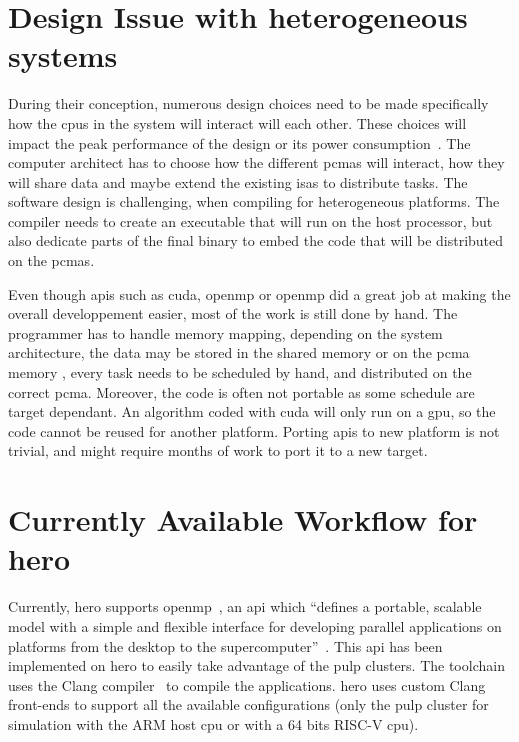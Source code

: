 \section {Design Issue with heterogeneous systems}

    During their conception, numerous design choices need to be made specifically how the \glspl{cpu} in the system will interact will each other. 
		These choices will impact the peak performance of the design or its power consumption~\cite{Art:Harnessing}.
		The computer architect has to choose how the different \glspl{pcma} will interact, how they will share data and maybe extend the existing \glspl{isa} to distribute tasks.
    The software design is challenging, when compiling for heterogeneous platforms.
	The compiler needs to create an executable that will run on the host processor, but also dedicate parts of the final binary to embed the code that will be distributed on the \glspl{pcma}.

	Even though \glspl{api} such as \gls{cuda}, \gls{openmp} or \gls{openmp} did a great job at making the overall developpement easier, most of the work is still done by hand.
	The programmer has to handle memory mapping, depending on the system architecture, the data may be stored in the shared memory or on the \gls{pcma} memory , every task needs to be scheduled by hand, and distributed on the correct \gls{pcma}. 
	Moreover, the code is often not portable as some schedule are target dependant.
	An algorithm coded with \gls{cuda} will only run on a \gls{gpu}, so the code cannot be reused for another platform.
	Porting \glspl{api} to new platform is not trivial, and might require months of work to port it to a new target.





\section {Currently Available Workflow for \acrshort{hero}}
    Currently, \gls{hero} supports \gls{openmp}~\cite{Report:SoftwareStack}, an \gls{api} which ``defines a portable, scalable model with a simple and flexible interface for developing parallel applications on platforms from the desktop to the supercomputer''~\cite{Web:OpenMp}. 
	This \gls{api} has been implemented on \gls{hero} to easily take advantage of the \gls{pulp} clusters. The toolchain uses the Clang compiler~\cite{Web:Wikipedia_OpenMP} to compile the applications. \gls{hero} uses custom Clang front-ends to support all the available configurations (only the \gls{pulp} cluster for simulation with the ARM host \gls{cpu} or with a 64 bits RISC-V \gls{cpu}).


